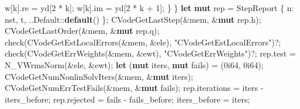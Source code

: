 \documentclass[
  10pt,
]{article}
\newenvironment{Shaded}{}{}
\newcommand{\BuiltInTok}[1]{\textcolor[rgb]{0.00,0.50,0.00}{#1}}
\newcommand{\DecValTok}[1]{\textcolor[rgb]{0.25,0.63,0.44}{#1}}
\newcommand{\KeywordTok}[1]{\textcolor[rgb]{0.00,0.44,0.13}{\textbf{#1}}}
\newcommand{\NormalTok}[1]{#1}
\newcommand{\OperatorTok}[1]{\textcolor[rgb]{0.40,0.40,0.40}{#1}}
\newcommand{\PreprocessorTok}[1]{\textcolor[rgb]{0.74,0.48,0.00}{#1}}
\newcommand{\StringTok}[1]{\textcolor[rgb]{0.25,0.44,0.63}{#1}}
\begin{document}
\begin{Shaded}
\begin{Highlighting}[]
\NormalTok{                w[k]}\OperatorTok{.}\NormalTok{re }\OperatorTok{=}\NormalTok{ yd[}\DecValTok{2} \OperatorTok{*}\NormalTok{ k]}\OperatorTok{;}
\NormalTok{                w[k]}\OperatorTok{.}\NormalTok{im }\OperatorTok{=}\NormalTok{ yd[}\DecValTok{2} \OperatorTok{*}\NormalTok{ k }\OperatorTok{+} \DecValTok{1}\NormalTok{]}\OperatorTok{;}
            \OperatorTok{\}}
        \OperatorTok{\}}
        \KeywordTok{let} \KeywordTok{mut}\NormalTok{ rep }\OperatorTok{=}\NormalTok{ StepReport }\OperatorTok{\{}\NormalTok{ n}\OperatorTok{:}\NormalTok{ nst}\OperatorTok{,}\NormalTok{ t}\OperatorTok{,} \OperatorTok{..}\BuiltInTok{Default}\PreprocessorTok{::}\KeywordTok{default}\NormalTok{() }\OperatorTok{\};}
\NormalTok{        CVodeGetLastStep(}\OperatorTok{\&}\NormalTok{mem}\OperatorTok{,} \OperatorTok{\&}\KeywordTok{mut}\NormalTok{ rep}\OperatorTok{.}\NormalTok{h)}\OperatorTok{;}
\NormalTok{        CVodeGetLastOrder(}\OperatorTok{\&}\NormalTok{mem}\OperatorTok{,} \OperatorTok{\&}\KeywordTok{mut}\NormalTok{ rep}\OperatorTok{.}\NormalTok{q)}\OperatorTok{;}
\NormalTok{        check(CVodeGetEstLocalErrors(}\OperatorTok{\&}\NormalTok{mem}\OperatorTok{,} \OperatorTok{\&}\NormalTok{ele)}\OperatorTok{,} \StringTok{"CVodeGetEstLocalErrors"}\NormalTok{)}\OperatorTok{?;}
\NormalTok{        check(CVodeGetErrWeights(}\OperatorTok{\&}\NormalTok{mem}\OperatorTok{,} \OperatorTok{\&}\NormalTok{ewt)}\OperatorTok{,} \StringTok{"CVodeGetErrWeights"}\NormalTok{)}\OperatorTok{?;}
\NormalTok{        rep}\OperatorTok{.}\NormalTok{test }\OperatorTok{=}\NormalTok{ N\_VWrmsNorm(}\OperatorTok{\&}\NormalTok{ele}\OperatorTok{,} \OperatorTok{\&}\NormalTok{ewt)}\OperatorTok{;}
        \KeywordTok{let}\NormalTok{ (}\KeywordTok{mut}\NormalTok{ iters}\OperatorTok{,} \KeywordTok{mut}\NormalTok{ fails) }\OperatorTok{=}\NormalTok{ (}\DecValTok{0i64}\OperatorTok{,} \DecValTok{0i64}\NormalTok{)}\OperatorTok{;}
\NormalTok{        CVodeGetNumNonlinSolvIters(}\OperatorTok{\&}\NormalTok{mem}\OperatorTok{,} \OperatorTok{\&}\KeywordTok{mut}\NormalTok{ iters)}\OperatorTok{;}
\NormalTok{        CVodeGetNumErrTestFails(}\OperatorTok{\&}\NormalTok{mem}\OperatorTok{,} \OperatorTok{\&}\KeywordTok{mut}\NormalTok{ fails)}\OperatorTok{;}
\NormalTok{        rep}\OperatorTok{.}\NormalTok{iterations }\OperatorTok{=}\NormalTok{ iters }\OperatorTok{{-}}\NormalTok{ iters\_before}\OperatorTok{;}
\NormalTok{        rep}\OperatorTok{.}\NormalTok{rejected }\OperatorTok{=}\NormalTok{ fails }\OperatorTok{{-}}\NormalTok{ fails\_before}\OperatorTok{;}
\NormalTok{        iters\_before }\OperatorTok{=}\NormalTok{ iters}\OperatorTok{;}

\end{Highlighting}
\end{Shaded}
\end{document}
